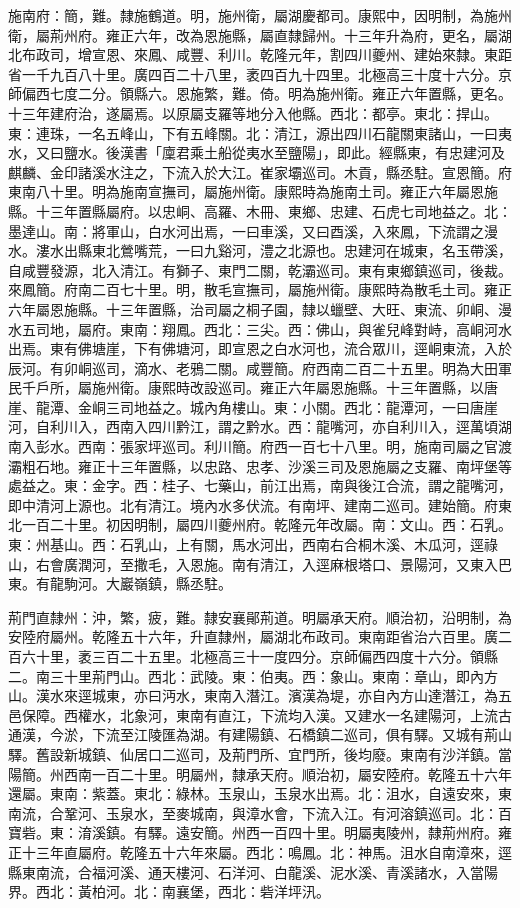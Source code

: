 \begin{pinyinscope}
施南府：簡，難。隸施鶴道。明，施州衛，屬湖慶都司。康熙中，因明制，為施州衛，屬荊州府。雍正六年，改為恩施縣，屬直隸歸州。十三年升為府，更名，屬湖北布政司，增宣恩、來鳳、咸豐、利川。乾隆元年，割四川夔州、建始來隸。東距省一千九百八十里。廣四百二十八里，袤四百九十四里。北極高三十度十六分。京師偏西七度二分。領縣六。恩施繁，難。倚。明為施州衛。雍正六年置縣，更名。十三年建府治，遂屬焉。以原屬支羅等地分入他縣。西北：都亭。東北：捍山。東：連珠，一名五峰山，下有五峰關。北：清江，源出四川石龍關東諸山，一曰夷水，又曰鹽水。後漢書「廩君乘土船從夷水至鹽陽」，即此。經縣東，有忠建河及麒麟、金印諸溪水注之，下流入於大江。崔家壩巡司。木貢，縣丞駐。宣恩簡。府東南八十里。明為施南宣撫司，屬施州衛。康熙時為施南土司。雍正六年屬恩施縣。十三年置縣屬府。以忠峒、高羅、木冊、東鄉、忠建、石虎七司地益之。北：墨達山。南：將軍山，白水河出焉，一曰車溪，又曰酉溪，入來鳳，下流謂之漫水。漊水出縣東北鶯嘴荒，一曰九谿河，澧之北源也。忠建河在城東，名玉帶溪，自咸豐發源，北入清江。有獅子、東門二關，乾灞巡司。東有東鄉鎮巡司，後裁。來鳳簡。府南二百七十里。明，散毛宣撫司，屬施州衛。康熙時為散毛土司。雍正六年屬恩施縣。十三年置縣，治司屬之桐子園，隸以蠟壁、大旺、東流、卯峒、漫水五司地，屬府。東南：翔鳳。西北：三尖。西：佛山，與雀兒峰對峙，高峒河水出焉。東有佛塘崖，下有佛塘河，即宣恩之白水河也，流合眾川，逕峒東流，入於辰河。有卯峒巡司，滴水、老鴉二關。咸豐簡。府西南二百二十五里。明為大田軍民千戶所，屬施州衛。康熙時改設巡司。雍正六年屬恩施縣。十三年置縣，以唐崖、龍潭、金峒三司地益之。城內角樓山。東：小關。西北：龍潭河，一曰唐崖河，自利川入，西南入四川黔江，謂之黔水。西：龍嘴河，亦自利川入，逕萬頃湖南入彭水。西南：張家坪巡司。利川簡。府西一百七十八里。明，施南司屬之官渡灞粗石地。雍正十三年置縣，以忠路、忠孝、沙溪三司及恩施屬之支羅、南坪堡等處益之。東：金字。西：桂子、七藥山，前江出焉，南與後江合流，謂之龍嘴河，即中清河上源也。北有清江。境內水多伏流。有南坪、建南二巡司。建始簡。府東北一百二十里。初因明制，屬四川夔州府。乾隆元年改屬。南：文山。西：石乳。東：州基山。西：石乳山，上有關，馬水河出，西南右合桐木溪、木瓜河，逕祿山，右會廣潤河，至撒毛，入恩施。南有清江，入逕麻根塔口、景陽河，又東入巴東。有龍駒河。大巖嶺鎮，縣丞駐。

荊門直隸州：沖，繁，疲，難。隸安襄鄖荊道。明屬承天府。順治初，沿明制，為安陸府屬州。乾隆五十六年，升直隸州，屬湖北布政司。東南距省治六百里。廣二百六十里，袤三百二十五里。北極高三十一度四分。京師偏西四度十六分。領縣二。南三十里荊門山。西北：武陵。東：伯夷。西：象山。東南：章山，即內方山。漢水來逕城東，亦曰沔水，東南入潛江。濱漢為堤，亦自內方山達潛江，為五邑保障。西權水，北象河，東南有直江，下流均入漢。又建水一名建陽河，上流古通漢，今淤，下流至江陵匯為湖。有建陽鎮、石橋鎮二巡司，俱有驛。又城有荊山驛。舊設新城鎮、仙居口二巡司，及荊門所、宜門所，後均廢。東南有沙洋鎮。當陽簡。州西南一百二十里。明屬州，隸承天府。順治初，屬安陸府。乾隆五十六年還屬。東南：紫蓋。東北：綠林。玉泉山，玉泉水出焉。北：沮水，自遠安來，東南流，合鞏河、玉泉水，至麥城南，與漳水會，下流入江。有河溶鎮巡司。北：百寶砦。東：淯溪鎮。有驛。遠安簡。州西一百四十里。明屬夷陵州，隸荊州府。雍正十三年直屬府。乾隆五十六年來屬。西北：鳴鳳。北：神馬。沮水自南漳來，逕縣東南流，合福河溪、通天樓河、石洋河、白龍溪、泥水溪、青溪諸水，入當陽界。西北：黃柏河。北：南襄堡，西北：砦洋坪汛。


\end{pinyinscope}
